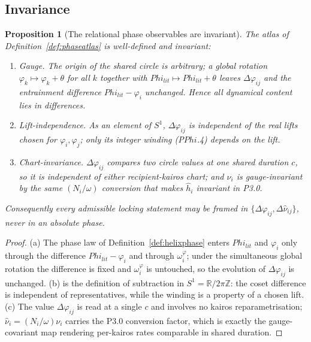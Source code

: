 \documentclass[11pt,a4paper]{article}
\newcommand{\cint}{\ensuremath{\mathfrak c}}
\def\Phi{Phi}%
\def\mathfrak#1{#1}%
\def\mathrm#1{#1}%
\def\emph#1{#1}%
\theoremstyle{definition}
\theoremstyle{plain}
\newtheorem{proposition}[definition]{Proposition}
\theoremstyle{remark}
\begin{document}
\subsection{Invariance}

\begin{proposition}[The relational phase observables are invariant]\label{prop:phaseinv}
The atlas of Definition~\ref{def:phaseatlas} is well-defined and invariant:
\begin{enumerate}[label=\textup{(\alph*)},leftmargin=1.2cm]
\item \emph{Gauge.} The origin of the shared circle is arbitrary; a global rotation
\(\varphi_k\mapsto\varphi_k+\theta\) for all \(k\) together with
\(\Phi_{\mathrm{lit}}\mapsto\Phi_{\mathrm{lit}}+\theta\) leaves \(\Delta\varphi_{ij}\) and the
entrainment difference \(\Phi_{\mathrm{lit}}-\varphi_i\) unchanged. Hence all dynamical content
lies in differences.
\item \emph{Lift-independence.} As an element of \(S^1\), \(\Delta\varphi_{ij}\) is independent
of the real lifts chosen for \(\varphi_i,\varphi_j\); only its integer winding (P$\Phi$.4)
depends on the lift.
\item \emph{Chart-invariance.} \(\Delta\varphi_{ij}\) compares two circle values at one shared
duration \(\cint\), so it is independent of either recipient-kairos chart; and \(\hat\nu_i\) is
gauge-invariant by the same \((N_i/\omega)\) conversion that makes \(\hat h_i\) invariant in
P3.0.
\end{enumerate}
Consequently every admissible locking statement may be framed in
\(\{\Delta\varphi_{ij},\Delta\hat\nu_{ij}\}\), never in an absolute phase.
\end{proposition}

\begin{proof}
(a) The phase law of Definition~\ref{def:helixphase} enters \(\Phi_{\mathrm{lit}}\) and
\(\varphi_i\) only through the difference \(\Phi_{\mathrm{lit}}-\varphi_i\) and through
\(\omega_i^\varphi\); under the simultaneous global rotation the difference is fixed and
\(\omega_i^\varphi\) is untouched, so the evolution of \(\Delta\varphi_{ij}\) is unchanged. (b)
is the definition of subtraction in \(S^1=\mathbb R/2\pi\mathbb Z\): the coset difference is
independent of representatives, while the winding is a property of a chosen lift. (c) The value
\(\Delta\varphi_{ij}\) is read at a single \(\cint\) and involves no kairos reparametrisation;
\(\hat\nu_i=(N_i/\omega)\nu_i\) carries the P3.0 conversion factor, which is exactly the
gauge-covariant map rendering per-kairos rates comparable in shared duration. \qedhere
\end{proof}
\end{document}
